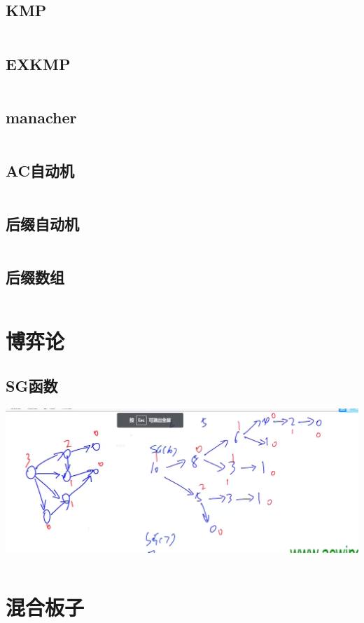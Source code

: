 \documentclass[a4paper,11pt]{article}
\begin{document}
\subsection{KMP}
\inputminted[breaklines]{c++}{字符串/kmp.cpp}
\subsection{EXKMP}
\inputminted[breaklines]{c++}{字符串/exkmp.cpp}
\subsection{manacher}
\inputminted[breaklines]{c++}{字符串/manacher.cpp}
\subsection{AC自动机}
\inputminted[breaklines]{c++}{字符串/ac自动机.cpp}
\subsection{后缀自动机}
\inputminted[breaklines]{c++}{字符串/后缀自动机.cpp}
\subsection{后缀数组}
\inputminted[breaklines]{c++}{字符串/后缀数组.cpp}

\newpage
\section{博弈论} %
\subsection{SG函数} %
\includegraphics[scale=0.3]{博弈论/sg.png}
\inputminted[breaklines]{c++}{博弈论/sg函数.cpp}

\newpage
\section{混合板子}
\end{document}
